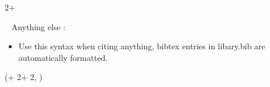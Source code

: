 \documentclass{beamer}
\newlength{\blockFour}
\begin{document}
\begin{frame}[t]
\begin{textblock*}{2\colwidth + \colsep}
\begin{parblock}{~}
	\vspace{0.666667\baselineskip}\noindent%
	\alert{Anything else} :
	\begin{itemize}
		\setlength{\itemsep}{0pt}
		\item Use this syntax when citing anything, bibtex entries in libary.bib are automatically formatted.
	\end{itemize}

\end{parblock}

\end{textblock*}




\begin{textblock*}{\colwidth}(\leftmargin + 2\colwidth + 2\colsep, \blockFour)

\begin{parblock}{\textmd{\refname}}
	\vspace{-1.333333\baselineskip}  %
	\setlength{\bibhang}{0pt}
	\setlength{\bibsep}{0\baselineskip}
	\renewcommand*{\bibfont}{\sffamily\small\setlength{\baselineskip}{28.8pt}}
	\renewcommand*{\bf}{\bfseries}
	\begin{refcontext}[sorting = nyt]
	\printbibliography[heading = none]
	\end{refcontext}
\end{parblock}

\end{textblock*}

\end{frame}
\end{document}

